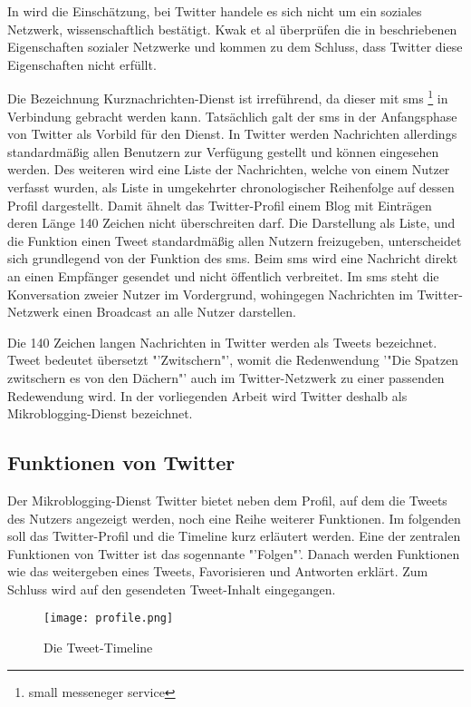 			In \cite{Kwak2010} wird die Einschätzung, bei Twitter handele es sich nicht um ein soziales Netzwerk, wissenschaftlich bestätigt.
			Kwak et al überprüfen die in \cite{Newman2003} beschriebenen Eigenschaften sozialer Netzwerke und kommen zu dem Schluss, dass Twitter diese Eigenschaften nicht erfüllt.	

			Die Bezeichnung Kurznachrichten-Dienst ist irreführend, da dieser mit sms \footnote{small messeneger service} in Verbindung gebracht werden kann. 
			Tatsächlich galt der sms in der Anfangsphase von Twitter als Vorbild für den Dienst.
			In Twitter werden Nachrichten allerdings standardmäßig allen Benutzern zur Verfügung gestellt und können eingesehen werden. 
			Des weiteren wird eine Liste der Nachrichten, welche von einem Nutzer verfasst wurden, als Liste in umgekehrter chronologischer Reihenfolge auf dessen Profil dargestellt.
			Damit ähnelt das Twitter-Profil einem Blog mit Einträgen deren Länge 140 Zeichen nicht überschreiten darf. 
			Die Darstellung als Liste, und die Funktion einen Tweet standardmäßig allen Nutzern freizugeben, unterscheidet sich grundlegend von der Funktion des sms.
			Beim sms wird eine Nachricht direkt an einen Empfänger gesendet und nicht öffentlich verbreitet.
			Im sms steht die Konversation zweier Nutzer im Vordergrund, wohingegen Nachrichten im Twitter-Netzwerk einen Broadcast an alle Nutzer darstellen.

			Die 140 Zeichen langen Nachrichten in Twitter werden als Tweets bezeichnet.
			Tweet bedeutet übersetzt "'Zwitschern"', womit die Redenwendung '"Die Spatzen zwitschern es von den Dächern"' auch im Twitter-Netzwerk zu einer passenden Redewendung wird.  
			In der vorliegenden Arbeit wird Twitter deshalb als Mikroblogging-Dienst bezeichnet.
	
		\subsection{Funktionen von Twitter}
			
			Der Mikroblogging-Dienst Twitter bietet neben dem Profil, auf dem die Tweets des Nutzers angezeigt werden, noch eine Reihe weiterer Funktionen. 
			Im folgenden soll das Twitter-Profil und die Timeline kurz erläutert werden. 
			Eine der zentralen Funktionen von Twitter ist das sogennante "'Folgen"'.
			Danach werden Funktionen wie das weitergeben eines Tweets, Favorisieren und Antworten erklärt. 
			Zum Schluss wird auf den gesendeten Tweet-Inhalt eingegangen.

			\begin{figure}[h!]
			\begin{center}
			\texttt{[image: profile.png]}
			\caption{Die Tweet-Timeline}
			\label{img:twitterProfile}
			\end{center}
			\end{figure}	


